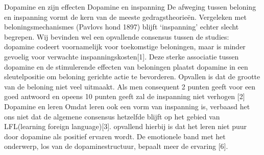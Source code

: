 \documentclass{hogent-article}
\begin{document}
Dopamine en zijn effecten
Dopamine en inspanning
De afweging tussen beloning en inspanning vormt de kern van de meeste gedragstheorieën. Vergeleken met beloningsmechanismes (Pavlovs hond 1897) blijft ‘inspanning’ echter slecht begrepen. Wij bevinden wel een opvallende consensus tussen de studies: dopamine codeert voornamelijk voor toekomstige beloningen, maar is minder gevoelig voor verwachte inspanningskosten[1]. Deze sterke associatie tussen dopamine en de stimulerende effecten van beloningen plaatst dopamine in een sleutelpositie om beloning gerichte actie te bevorderen. Opvallen is dat de grootte van de beloning niet veel uitmaakt. Als men consequent 2 punten geeft voor een goed antwoord en opeens 10 punten geeft zal de inspanning niet verhogen [2]
Dopamine en leren
Omdat leren ook een vorm van inspanning is, verbaasd het ons niet dat de algemene consensus hetzelfde blijft op het gebied van LFL(learning foreign language)[3]. opvallend hierbij is dat het leren niet puur door dopamine als positief ervaren wordt. De emotionele band met het onderwerp, los van de dopaminestructuur, bepaalt meer de ervaring [6].
\end{document}
